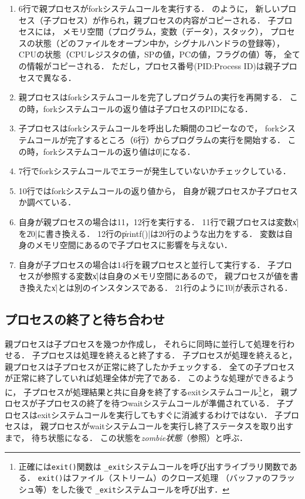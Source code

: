 \begin{description}
  \begin{enumerate}
  \item 6行で親プロセスがforkシステムコールを実行する．
    のように，
    新しいプロセス（子プロセス）が作られ，親プロセスの内容がコピーされる．
    子プロセスには，
    メモリ空間（プログラム，変数（データ），スタック），
    プロセスの状態（どのファイルをオープン中か，シグナルハンドラの登録等），
    CPUの状態（CPUレジスタの値，SPの値，PCの値，フラグの値）等，
    全ての情報がコピーされる．
    ただし，プロセス番号(PID:Process ID)は親子プロセスで異なる．
  \item 親プロセスはforkシステムコールを完了しプログラムの実行を再開する．
    この時，forkシステムコールの返り値は子プロセスのPIDになる．
  \item 子プロセスはforkシステムコールを呼出した瞬間のコピーなので，
    forkシステムコールが完了するところ（6行）からプログラムの実行を開始する．
    この時，forkシステムコールの返り値は\|0|になる．
  \item 7行でforkシステムコールでエラーが発生していないかチェックしている．
  \item 10行ではforkシステムコールの返り値から，
    自身が親プロセスか子プロセスか調べている．
  \item 自身が親プロセスの場合は11，12行を実行する．
    11行で親プロセスは変数\|x|を\|20|に書き換える．
    12行の\|printf()|は20行のような出力をする．
    変数は自身のメモリ空間にあるので子プロセスに影響を与えない．
  \item 自身が子プロセスの場合は14行を親プロセスと並行して実行する．
    子プロセスが参照する変数\|x|は自身のメモリ空間にあるので，
    親プロセスが値を書き換えた\|x|とは別のインスタンスである．
    21行のように\|10|が表示される．
  \end{enumerate}
\end{description}

\subsection{プロセスの終了と待ち合わせ}
親プロセスは子プロセスを幾つか作成し，
それらに同時に並行して処理を行わせる．
子プロセスは処理を終えると終了する．
子プロセスが処理を終えると，
親プロセスは子プロセスが正常に終了したかチェックする．
全ての子プロセスが正常に終了していれば処理全体が完了である．
このような処理ができるように，
子プロセスが処理結果と共に自身を終了するexitシステムコール\footnote{
  正確には\texttt{exit()}関数は
  \texttt{\_exit}システムコールを呼び出すライブラリ関数である．
  \texttt{exit()}はファイル（ストリーム）のクローズ処理
  （バッファのフラッシュ等）をした後で
  \texttt{\_exit}システムコールを呼び出す．
}と，
親プロセスが子プロセスの終了を待つwaitシステムコールが準備されている．
子プロセスはexitシステムコールを実行してもすぐに消滅するわけではない．
子プロセスは，
親プロセスがwaitシステムコールを実行し終了ステータスを取り出すまで，
待ち状態になる．
この状態を\emph{zombie状態}（参照）と呼ぶ．

